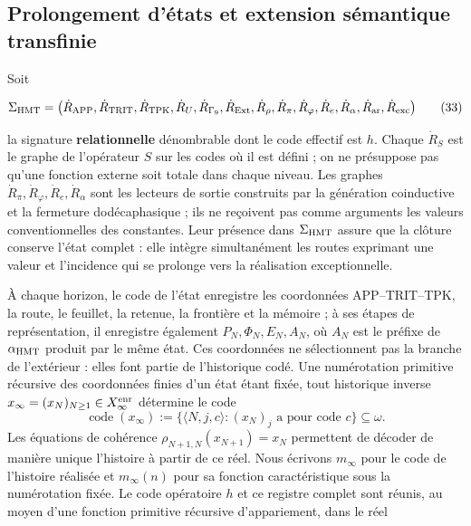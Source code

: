 \subsection{Prolongement d’états et extension sémantique transfinie}

Soit

\[
 \Sigma_{\rm HMT}
 =\bigl(\dot R_{\rm APP},\dot R_{\rm TRIT},\dot R_{\rm TPK},
 \dot R_{U},\dot R_{\Gamma_9},\dot R_{\rm Ext},\dot R_\rho,
 \dot R_{\pi},\dot R_{\varphi},\dot R_e,\dot R_{\alpha},
 \dot R_{\rm ar},\dot R_{\rm exc}\bigr)
\tag{33}\label{hmtfg:base:eq:ch-signatura}
\]

la signature \textbf{relationnelle} dénombrable dont le code effectif est \(h\). Chaque \(\dot R_S\) est le graphe de l'opérateur \(S\) sur les codes où il est défini ; on ne présuppose pas qu'une fonction externe soit totale dans chaque niveau. Les graphes \(\dot R_{\pi},\dot R_{\varphi},\dot R_e,\dot R_{\alpha}\) sont les lecteurs de sortie construits par la génération coinductive et la fermeture dodécaphasique ; ils ne reçoivent pas comme arguments les valeurs conventionnelles des constantes. Leur présence dans \(\Sigma_{\rm HMT}\) assure que la clôture conserve l'état complet : elle intègre simultanément les routes exprimant une valeur et l'incidence qui se prolonge vers la réalisation exceptionnelle.

À chaque horizon, le code de l'état enregistre les coordonnées APP--TRIT--TPK, la route, le feuillet, la retenue, la frontière et la mémoire ; à ses étapes de représentation, il enregistre également \(P_N,\Phi_N,E_N,A_N\), où \(A_N\) est le préfixe de \(\alpha_{\rm HMT}\) produit par le même état. Ces coordonnées ne sélectionnent pas la branche de l'extérieur : elles font partie de l'historique codé. Une numérotation primitive récursive des coordonnées finies d'un état étant fixée, tout historique inverse \(x_\infty=(x_N)_{N\geq1}\in X_\infty^{\rm enr}\) détermine le code
\[
 \operatorname{code}(x_\infty)
 :=\{\langle N,j,c\rangle:(x_N)_j\text{ a pour code }c\}\subseteq\omega.
\]
Les équations de cohérence
\(\rho_{N+1,N}(x_{N+1})=x_N\) permettent de décoder de manière unique
l’histoire à partir de ce réel. Nous écrivons \(m_\infty\) pour le code de
l’histoire réalisée et \(m_\infty(n)\) pour sa fonction caractéristique sous la
numérotation fixée. Le code opératoire \(h\) et ce registre complet sont
réunis, au moyen d’une fonction primitive récursive d’appariement, dans le réel

